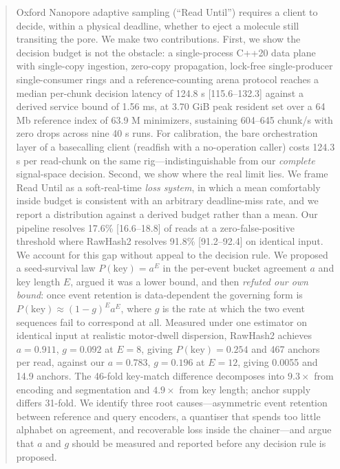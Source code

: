 \documentclass[sigconf,nonacm]{acmart}
\begin{document}
\begin{abstract}
Oxford Nanopore adaptive sampling (``Read Until'') requires a client to decide, within a
physical deadline, whether to eject a molecule still transiting the pore. We make two
contributions. First, we show the decision budget is not the obstacle: a single-process C++20
data plane with single-copy ingestion, zero-copy propagation, lock-free single-producer
single-consumer rings and a reference-counting arena protocol reaches a median per-chunk
decision latency of 124.8 \textmu{}s [115.6--132.3] against a derived service bound of 1.56 ms, at
3.70 GiB peak resident set over a 64 Mb reference index of 63.9 M minimizers, sustaining
604--645 chunk/s with zero drops across nine 40 s runs. For calibration, the bare orchestration
layer of a basecalling client (readfish with a no-operation caller) costs 124.3 \textmu{}s per
read-chunk on the same rig---indistinguishable from our \emph{complete} signal-space decision.
Second, we show where the real limit lies. We frame Read Until as a soft-real-time
\emph{loss system}, in which a mean comfortably inside budget is consistent with an arbitrary
deadline-miss rate, and we report a distribution against a derived budget rather than a mean.
Our pipeline resolves 17.6\% [16.6--18.8] of reads at a zero-false-positive threshold where
RawHash2 resolves 91.8\% [91.2--92.4] on identical input. We account for this gap without
appeal to the decision rule. We proposed a seed-survival law $P(\mathrm{key}) = a^{E}$ in the
per-event bucket agreement $a$ and key length $E$, argued it was a lower bound, and then
\emph{refuted our own bound}: once event retention is data-dependent the governing form is
$P(\mathrm{key}) \approx (1-g)^{E} a^{E}$, where $g$ is the rate at which the two event
sequences fail to correspond at all. Measured under one estimator on identical input at
realistic motor-dwell dispersion, RawHash2 achieves $a = 0.911$, $g = 0.092$ at $E = 8$,
giving $P(\mathrm{key}) = 0.254$ and 467 anchors per read, against our $a = 0.783$,
$g = 0.196$ at $E = 12$, giving 0.0055 and 14.9 anchors. The 46-fold key-match difference
decomposes into $9.3\times$ from encoding and segmentation and $4.9\times$ from key length; anchor supply
differs 31-fold. We identify three root causes---asymmetric event retention between reference
and query encoders, a quantiser that spends too little alphabet on agreement, and recoverable
loss inside the chainer---and argue that $a$ and $g$ should be measured and reported before any
decision rule is proposed.
\end{abstract}
\end{document}
